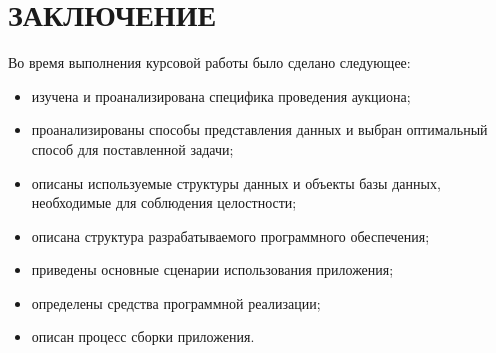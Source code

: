 \chapter*{ЗАКЛЮЧЕНИЕ}

Во время выполнения курсовой работы было сделано следующее:


\begin{itemize}
    \item изучена и проанализирована специфика проведения аукциона;
    \item проанализированы способы представления данных и выбран оптимальный способ для поставленной задачи;
    \item описаны используемые структуры данных и объекты базы данных, необходимые для соблюдения целостности;
    \item описана структура разрабатываемого программного обеспечения;
    \item приведены основные сценарии использования приложения;
    \item определены средства программной реализации;
    \item описан процесс сборки приложения.
\end{itemize}
